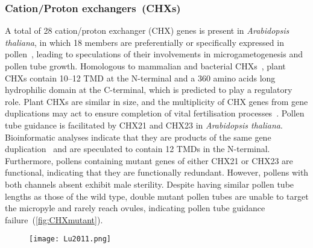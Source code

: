 \documentclass[11pt]{article}
\begin{document}
\begin{multicols*}{2}
\subsubsection{Cation/Proton exchangers~(CHXs)}
A total of 28 cation/proton exchanger (CHX) genes is present in \textit{Arabidopsis thaliana}, in which 18 members are preferentially or specifically expressed in pollen~\citep{Sze2004b}, leading to speculations of their involvements in microgametogenesis and pollen tube growth. Homologous to mammalian and bacterial CHXs~\citep{Grabov2007}, plant CHXs contain 10--12 TMD at the N-terminal and a 360 amino acids long hydrophilic domain at the C-terminal, which is predicted to play a regulatory role. Plant CHXs are similar in size, and the multiplicity of CHX genes from gene duplications may act to ensure completion of vital fertilisation processes~\citep{Sze2004b,Lu2011}.
\newline\newline
Pollen tube guidance is facilitated by CHX21 and CHX23 in \textit{Arabidopsis thaliana}. Bioinformatic analyses indicate that they are products of the same gene duplication~\citep{Sze2004b} and are speculated to contain 12 TMDs in the N-terminal. Furthermore, pollens containing mutant genes of either CHX21 or CHX23 are functional, indicating that they are functionally redundant. However, pollens with both channels absent exhibit male sterility. Despite having similar pollen tube lengths as those of the wild type, double mutant pollen tubes are unable to target the micropyle and rarely reach ovules, indicating pollen tube guidance failure~(\autoref{fig:CHXmutant})\citep{Lu2011}. 

\begin{figure}[H]
  \centering
    \texttt{[image: Lu2011.png]}
  \label{fig:CHXmutant}
\end{figure}


\end{multicols*}
\end{document}
